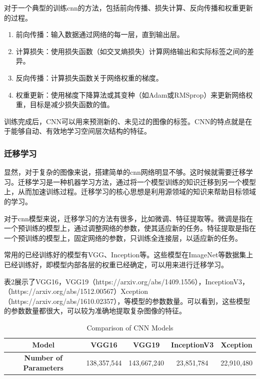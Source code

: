 对于一个典型的训练cnn的方法，包括前向传播、损失计算、反向传播和权重更新的过程。
\begin{enumerate}
    \item 前向传播：输入数据通过网络的每一层，直到输出层。
    \item 计算损失：使用损失函数（如交叉熵损失）计算网络输出和实际标签之间的差异。
    \item 反向传播：计算损失函数关于网络权重的梯度。
    \item 权重更新：使用梯度下降算法或其变种（如Adam或RMSprop）来更新网络权重，目标是减少损失函数的值。
\end{enumerate}
训练完成后，CNN可以用来预测新的、未见过的图像的标签。CNN的特点就是在于能够自动、有效地学习空间层次结构的特征。

\subsubsection{迁移学习}

显然，对于复杂的图像来说，搭建简单的cnn网络明显不够。这时候就需要迁移学习。迁移学习是一种机器学习方法，通过将一个模型训练的知识迁移到另一个模型上，从而加速训练过程。迁移学习的核心思想是利用源领域的知识来帮助目标领域的学习。

对于cnn模型来说，迁移学习的方法有很多，比如微调、特征提取等。微调是指在一个预训练的模型上，通过调整网络的参数，使其适应新的任务。特征提取是指在一个预训练的模型上，固定网络的参数，只训练全连接层，以适应新的任务。

常用的已经训练好的模型有VGG、Inception等。这些模型在ImageNet等数据集上已经训练好，即模型内部各层的权重已经确定，可以用来进行迁移学习。

表2展示了VGG16，VGG19（https://arxiv.org/abs/1409.1556），InceptionV3，（https://arxiv.org/abs/1512.00567）Xception（https://arxiv.org/abs/1610.02357），等模型的参数数量。可以看到，这些模型的参数数量都很大，可以较为准确地提取复杂图像的特征。

\begin{table}[htbp]
    \centering
    \caption{Comparison of CNN Models}
    \label{tab:model_comparison}
    \begin{tabular}{ccccc}
        \toprule
        \textbf{Model} & \textbf{VGG16} & \textbf{VGG19} & \textbf{InceptionV3} & \textbf{Xception} \\
        \midrule
        \textbf{Number of Parameters} & 138,357,544 & 143,667,240 & 23,851,784 & 22,910,480 \\
        \bottomrule
    \end{tabular}
\end{table}


\FloatBarrier






